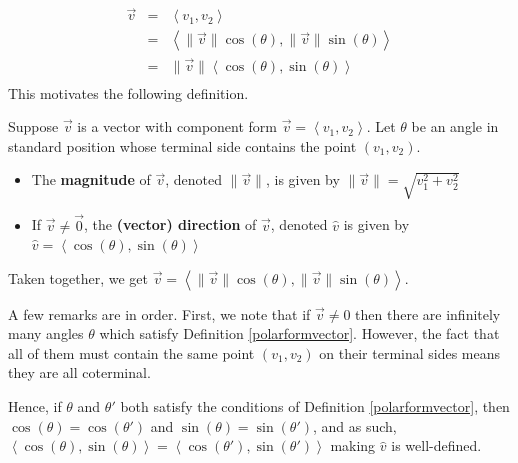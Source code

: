 \documentclass{ximera}
\begin{document}
\[ \begin{array}{rcl} \overrightarrow{v} & = & \left< v_1 , v_2  \right> \\   
															& = & \left< \| \overrightarrow{v} \| \cos(\theta), \| \overrightarrow{v} \| \sin(\theta) \right> \\   
													    & = &  \| \overrightarrow{v} \| \left< \cos(\theta),\sin(\theta) \right> \\ \end{array} \]
This motivates the following definition.

 

\begin{definition} \label{polarformvector}  Suppose $\overrightarrow{v}$ is a vector with component form $\overrightarrow{v} =\left< v_1 , v_2  \right>$.  Let $\theta$ be an angle in standard position whose terminal side contains the point $\left(v_1,v_2\right)$.

\begin{itemize}

\item  The  \textbf{magnitude} of $\overrightarrow{v}$, denoted $\| \overrightarrow{v} \|$, is given by $\| \overrightarrow{v} \| =   \sqrt{v_1^2 + v_2^2}$

\item If $\overrightarrow{v} \neq \overrightarrow{0}$,  the \textbf{(vector) direction} of $\overrightarrow{v}$, denoted $\hat{v}$ is given by  $\hat{v} = \left< \cos(\theta), \sin(\theta) \right>$

\end{itemize}

Taken together, we get $\overrightarrow{v} =  \left< \| \overrightarrow{v} \| \cos(\theta), \| \overrightarrow{v} \| \sin(\theta) \right>$.

\end{definition}

 

A few remarks are in order.   First, we note that if  $\overrightarrow{v} \neq 0$ then  there are infinitely many  angles $\theta$ which satisfy Definition \ref{polarformvector}.   However, the fact that all of them must contain the same point $\left(v_1,v_2\right)$  on their terminal sides means they are all coterminal.  

 

Hence, if $\theta$ and $\theta'$ both satisfy the conditions of Definition \ref{polarformvector}, then $\cos(\theta) = \cos(\theta')$ and $\sin(\theta) = \sin(\theta')$, and as such, $ \left< \cos(\theta), \sin(\theta) \right> =  \left< \cos(\theta'), \sin(\theta') \right>$ making $\hat{v}$ is well-defined.
\end{document}
